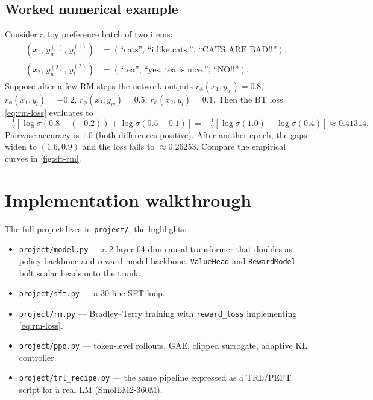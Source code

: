 \documentclass[11pt,oneside]{scrbook}
\begin{document}
\section{Worked numerical example}

Consider a toy preference batch of two items:
\[
\begin{aligned}
(x_1,\,y_w^{(1)},\,y_l^{(1)}) &= (\text{``cats''},\,\text{``i like cats.''},\,\text{``CATS ARE BAD!!''}), \\
(x_2,\,y_w^{(2)},\,y_l^{(2)}) &= (\text{``tea''},\,\text{``yes, tea is nice.''},\,\text{``NO!!''}).
\end{aligned}
\]
Suppose after a few RM steps the network outputs
$r_\phi(x_1, y_w) = 0.8$, $r_\phi(x_1, y_l) = -0.2$,
$r_\phi(x_2, y_w) = 0.5$, $r_\phi(x_2, y_l) = 0.1$.
Then the BT loss \eqref{eq:rm-loss} evaluates to
\[
-\tfrac12\!\left[\log\sigma(0.8 - (-0.2)) + \log\sigma(0.5 - 0.1)\right]
= -\tfrac12[\log\sigma(1.0) + \log\sigma(0.4)]
\approx 0.41314.
\]
Pairwise accuracy is $1.0$ (both differences positive). After
another epoch, the gaps widen to $(1.6, 0.9)$ and the loss falls to
$\approx 0.26253$. Compare the empirical curves in \autoref{fig:sft-rm}.

\chapter{Implementation walkthrough}

The full project lives in
\href{run:./project/}{\texttt{project/}}; the highlights:

\begin{itemize}
  \item \texttt{project/model.py} --- a 2-layer 64-dim causal transformer
        that doubles as policy backbone and reward-model backbone.
        \texttt{ValueHead} and \texttt{RewardModel} bolt scalar heads
        onto the trunk.
  \item \texttt{project/sft.py} --- a 30-line SFT loop.
  \item \texttt{project/rm.py} --- Bradley--Terry training with
        \texttt{reward\_loss} implementing \eqref{eq:rm-loss}.
  \item \texttt{project/ppo.py} --- token-level rollouts, GAE,
        clipped surrogate, adaptive KL controller.
  \item \texttt{project/trl\_recipe.py} --- the same pipeline expressed
        as a TRL/PEFT script for a real LM (SmolLM2-360M).
\end{itemize}
\end{document}

